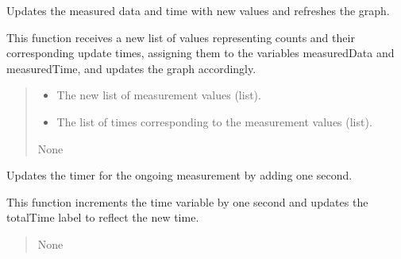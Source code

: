 \documentclass[letterpaper,10pt,english]{sphinxmanual}
\begin{document}
\begin{fulllineitems}

\begin{fulllineitems}
\label{\detokenize{FLIMGraphics:FLIMGraphics.FLIMGraphic.updateMeasurement}}
\pysigstartsignatures
{}
\pysigstopsignatures
\sphinxAtStartPar
Updates the measured data and time with new values and refreshes the graph.

\sphinxAtStartPar
This function receives a new list of values representing counts and their corresponding
update times, assigning them to the variables measuredData and measuredTime, and 
updates the graph accordingly.
\begin{quote}\begin{description}
\begin{itemize}
\item {} 
\sphinxAtStartPar
{} \textendash{} The new list of measurement values (list).

\item {} 
\sphinxAtStartPar
{} \textendash{} The list of times corresponding to the measurement values (list).

\end{itemize}

\sphinxAtStartPar
None

\end{description}\end{quote}

\end{fulllineitems}


\begin{fulllineitems}
\label{\detokenize{FLIMGraphics:FLIMGraphics.FLIMGraphic.update_timer}}
\pysigstartsignatures
{}
\pysigstopsignatures
\sphinxAtStartPar
Updates the timer for the ongoing measurement by adding one second.

\sphinxAtStartPar
This function increments the time variable by one second and updates the 
totalTime label to reflect the new time.
\begin{quote}\begin{description}
\sphinxAtStartPar
None

\end{description}\end{quote}

\end{fulllineitems}


\end{fulllineitems}
\end{document}
